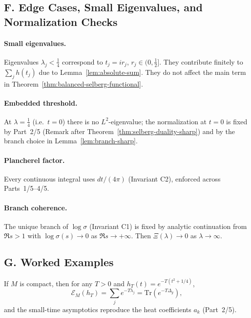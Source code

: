 
\subsection*{F. Edge Cases, Small Eigenvalues, and Normalization Checks}
\label{subsec:edge}

\paragraph{Small eigenvalues.} Eigenvalues $\lambda_j<\tfrac14$ correspond to $t_j=ir_j$, $r_j\in(0,\tfrac12]$. They contribute finitely to $\sum_j h(t_j)$ due to Lemma~\ref{lem:absolute-sum}. They do not affect the main term in Theorem~\ref{thm:balanced-selberg-functional}.

\paragraph{Embedded threshold.} At $\lambda=\tfrac14$ (i.e.\ $t=0$) there is no $L^2$-eigenvalue; the normalization at $t=0$ is fixed by Part~2/5 (Remark after Theorem~\ref{thm:selberg-duality-sharp}) and by the branch choice in Lemma~\ref{lem:branch-sharp}.

\paragraph{Plancherel factor.} Every continuous integral uses $dt/(4\pi)$ (Invariant C2), enforced across Parts~1/5–4/5.

\paragraph{Branch coherence.} The unique branch of $\log\sigma$ (Invariant C1) is fixed by analytic continuation from $\Re s>1$ with $\log\sigma(s)\to 0$ as $\Re s\to+\infty$. Then $\Xi(\lambda)\to0$ as $\lambda\to\infty$.


\subsection*{G. Worked Examples}
\label{subsec:examples}

\begin{example}
If $M$ is compact, then for any $T>0$ and $h_T(t)=e^{-T(t^2+1/4)}$,
\[
  \mathcal E_M(h_T)=\sum_j e^{-T\lambda_j}=\mathrm{Tr}(e^{-T\Delta_g}),
\]
and the small-time asymptotics reproduce the heat coefficients $a_k$ (Part~2/5).
\end{example}

